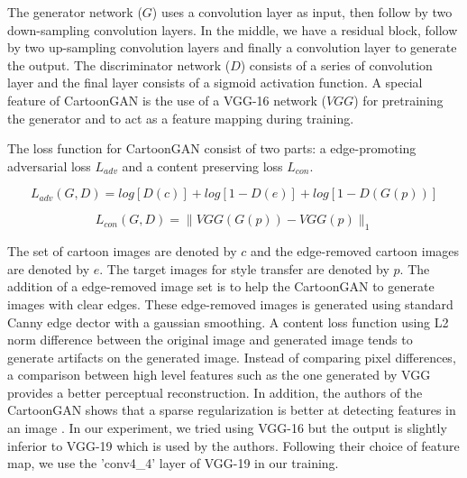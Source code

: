 \documentclass{article}
\begin{document}
The generator network ($G$) uses a convolution layer as input, then follow by two down-sampling convolution layers. In the middle, we have a residual block, follow by two up-sampling convolution layers and finally a convolution layer to generate the output. The discriminator network ($D$) consists of a series of convolution layer and the final layer consists of a sigmoid activation function. A special feature of CartoonGAN is the use of a VGG-16 network ($VGG$) for pretraining the generator and to act as a feature mapping during training.

The loss function for CartoonGAN consist of two parts: a edge-promoting adversarial loss $L_{adv}$ and a content preserving loss $L_{con}$.

\begin{equation}
  L_{adv}(G, D) = log[D(c)] + log[1-D(e)] + log[1-D(G(p))]
\end{equation}

\begin{equation}
  L_{con}(G, D) = \| VGG(G(p)) - VGG(p) \|_1
\end{equation}

The set of cartoon images are denoted by $c$ and the edge-removed cartoon images are denoted by $e$. The target images for style transfer are denoted by $p$. The addition of a edge-removed image set is to help the CartoonGAN to generate images with clear edges. These edge-removed images is generated using standard Canny edge dector with a gaussian smoothing. A content loss function using L2 norm difference between the original image and generated image tends to generate artifacts on the generated image. Instead of comparing pixel differences, a comparison between high level features such as the one generated by VGG provides a better perceptual reconstruction. In addition, the authors of the CartoonGAN shows that a sparse regularization is better at detecting features in an image \cite{CartoonGAN}. In our experiment, we tried using VGG-16 but the output is slightly inferior to VGG-19 which is used by the authors. Following their choice of feature map, we use the 'conv4_4' layer of VGG-19 in our training.
\end{document}
